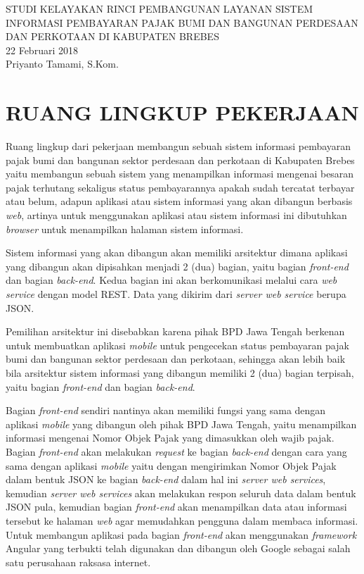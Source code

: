 \documentclass[pdftex,12pt, oneside]{article}
\begin{document}
%
\begin{center}
{\large STUDI KELAYAKAN RINCI PEMBANGUNAN LAYANAN SISTEM INFORMASI PEMBAYARAN PAJAK BUMI DAN BANGUNAN PERDESAAN DAN PERKOTAAN DI KABUPATEN BREBES}
\\[1cm]
22 Februari 2018\\
Priyanto Tamami, S.Kom.
\end{center}

\section{RUANG LINGKUP PEKERJAAN}

Ruang lingkup dari pekerjaan membangun sebuah sistem informasi pembayaran pajak bumi dan bangunan sektor perdesaan dan perkotaan di Kabupaten Brebes yaitu membangun sebuah sistem yang menampilkan informasi mengenai besaran pajak terhutang sekaligus status pembayarannya apakah sudah tercatat terbayar atau belum, adapun aplikasi atau sistem informasi yang akan dibangun berbasis \textit{web}, artinya untuk menggunakan aplikasi atau sistem informasi ini dibutuhkan \textit{browser} untuk menampilkan halaman sistem informasi.

Sistem informasi yang akan dibangun akan memiliki arsitektur dimana aplikasi yang dibangun akan dipisahkan menjadi 2 (dua) bagian, yaitu bagian \textit{front-end} dan bagian \textit{back-end}. Kedua bagian ini akan berkomunikasi melalui cara \textit{web service} dengan model REST. Data yang dikirim dari \textit{server web service} berupa JSON.

Pemilihan arsitektur ini disebabkan karena pihak BPD Jawa Tengah berkenan untuk membuatkan aplikasi \textit{mobile} untuk pengecekan status pembayaran pajak bumi dan bangunan sektor perdesaan dan perkotaan, sehingga akan lebih baik bila arsitektur sistem informasi yang dibangun memiliki 2 (dua) bagian terpisah, yaitu bagian \textit{front-end} dan bagian \textit{back-end}. 

Bagian \textit{front-end} sendiri nantinya akan memiliki fungsi yang sama dengan aplikasi \textit{mobile} yang dibangun oleh pihak BPD Jawa Tengah, yaitu menampilkan informasi mengenai Nomor Objek Pajak yang dimasukkan oleh wajib pajak. Bagian \textit{front-end} akan melakukan \textit{request} ke bagian \textit{back-end} dengan cara yang sama dengan aplikasi \textit{mobile} yaitu dengan mengirimkan Nomor Objek Pajak dalam bentuk JSON ke bagian \textit{back-end} dalam hal ini \textit{server web services}, kemudian \textit{server web services} akan melakukan respon seluruh data dalam bentuk JSON pula, kemudian bagian \textit{front-end} akan menampilkan data atau informasi tersebut ke halaman \textit{web} agar memudahkan pengguna dalam membaca informasi. Untuk membangun aplikasi pada bagian \textit{front-end} akan menggunakan \textit{framework} Angular yang terbukti telah digunakan dan dibangun oleh Google sebagai salah satu perusahaan raksasa internet.
\end{document}
